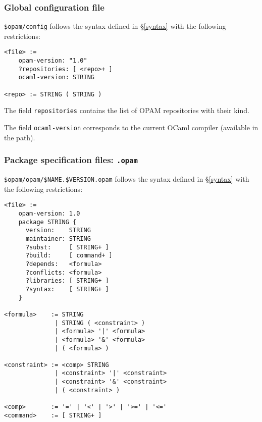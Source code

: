 \documentclass[a4paper,11pt]{article}
\begin{document}
\subsubsection{Global configuration file}
\label{config}

\verb+$opam/config+ follows the syntax defined in \S\ref{syntax} with
the following restrictions:

{\small
\begin{Verbatim}[frame=single]
<file> :=
    opam-version: "1.0"
    ?repositories: [ <repo>+ ]
    ocaml-version: STRING

<repo> := STRING ( STRING )
\end{Verbatim}
}

The field {\tt repositories} contains the list of OPAM
repositories with their kind.

The field {\tt ocaml-version} corresponds to the current OCaml
compiler (available in the path).

\subsubsection{Package specification files: {\tt .opam}}
\label{dotopam}

\verb+$opam/opam/$NAME.$VERSION.opam+ follows the syntax defined in
\S\ref{syntax} with the following restrictions:

{\small
\begin{Verbatim}[frame=single]
<file> :=
    opam-version: 1.0
    package STRING {
      version:    STRING
      maintainer: STRING
      ?subst:     [ STRING+ ]
      ?build:     [ command+ ]
      ?depends:   <formula>
      ?conflicts: <formula>
      ?libraries: [ STRING+ ]
      ?syntax:    [ STRING+ ]
    }

<formula>    := STRING
              | STRING ( <constraint> )
              | <formula> '|' <formula>
              | <formula> '&' <formula>
              | ( <formula> )

<constraint> := <comp> STRING
              | <constraint> '|' <constraint>
              | <constraint> '&' <constraint>
              | ( <constraint> )

<comp>       := '=' | '<' | '>' | '>=' | '<='
<command>    := [ STRING+ ]
\end{Verbatim}
}
\end{document}
